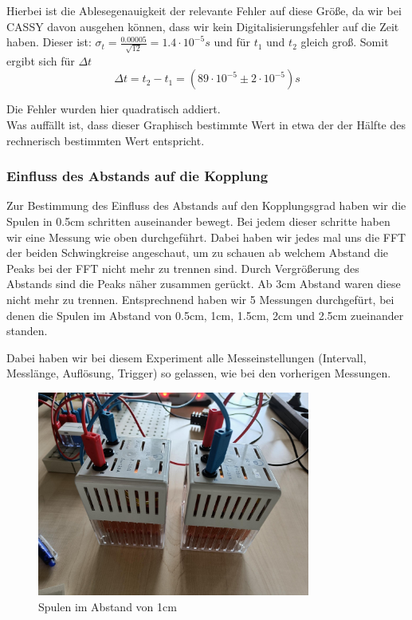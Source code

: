 \documentclass[twoside]{protokoll}
\begin{document}
Hierbei ist die Ablesegenauigkeit der relevante Fehler auf diese Größe, da wir bei CASSY davon ausgehen können, dass wir kein Digitalisierungsfehler auf die Zeit haben. 
Dieser ist: $\sigma_t = \frac{0.00005}{\sqrt{12}} = 1.4\cdot 10^{-5}s$  und für $t_1$ und $t_2$ gleich groß.
Somit ergibt sich für $\Delta t$
\begin{equation}
\Delta t = t_2 - t_1 =  (89\cdot 10^{-5} \pm 2\cdot10^{-5})s
\end{equation}

Die Fehler wurden hier quadratisch addiert. \\
Was auffällt ist, dass dieser Graphisch bestimmte Wert in etwa der der Hälfte des rechnerisch bestimmten Wert entspricht. 

\subsubsection{Einfluss des Abstands auf die Kopplung}
Zur Bestimmung des Einfluss des Abstands auf den Kopplungsgrad haben wir die Spulen in 0.5cm schritten auseinander bewegt. 
Bei jedem dieser schritte haben wir eine Messung wie oben durchgeführt. Dabei haben wir jedes mal uns die FFT der beiden Schwingkreise angeschaut, um zu schauen ab welchem Abstand die Peaks bei der FFT nicht mehr zu trennen sind. Durch Vergrößerung des Abstands sind die Peaks näher zusammen gerückt.
Ab 3cm Abstand waren diese nicht mehr zu trennen.
Entsprechnend haben wir 5 Messungen durchgefürt, bei denen die Spulen im Abstand von 0.5cm, 1cm, 1.5cm, 2cm und 2.5cm zueinander standen.

Dabei haben wir bei diesem Experiment alle Messeinstellungen (Intervall, Messlänge, Auflösung, Trigger) so gelassen, wie bei den vorherigen Messungen.

\begin{figure}[H]
    \centering
    \includegraphics[width=0.8\textwidth]{bilder/Abstand_Spulen.pdf}
    \caption{Spulen im Abstand von 1cm}
\end{figure}
\end{document}
